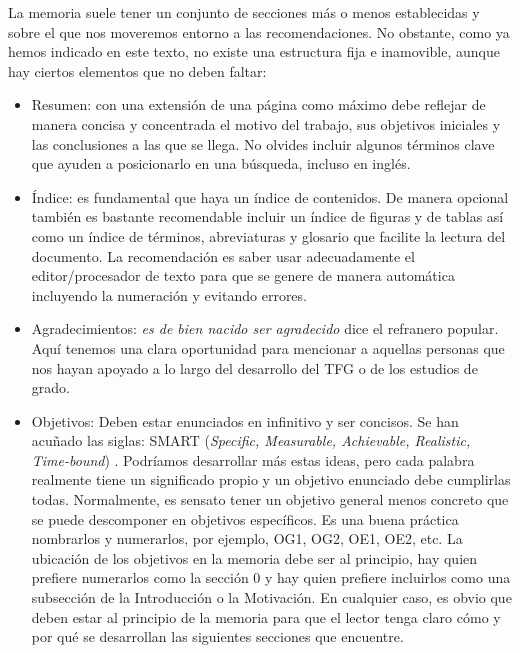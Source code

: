 La memoria suele tener un conjunto de secciones más o menos establecidas y sobre el que nos moveremos entorno a las recomendaciones. No obstante, como ya hemos indicado en este texto, no existe una estructura fija e inamovible, aunque hay ciertos elementos que no deben faltar:

\begin{itemize}
    \item Resumen: con una extensión de una página como máximo debe reflejar de manera concisa y concentrada el motivo del trabajo, sus objetivos iniciales y las conclusiones a las que se llega. No olvides incluir algunos términos clave que ayuden a posicionarlo en una búsqueda, incluso en inglés.
    \item Índice: es fundamental que haya un índice de contenidos. De manera opcional también es bastante recomendable incluir un índice de figuras y de tablas así como un índice de términos, abreviaturas y glosario que facilite la lectura del documento. La recomendación es saber usar adecuadamente el editor/procesador de texto para que se genere de manera automática incluyendo la numeración y evitando errores.
    
    \item Agradecimientos: {\it es de bien nacido ser agradecido} dice el refranero popular. Aquí tenemos una clara oportunidad para mencionar a aquellas personas que nos hayan apoyado a lo largo del desarrollo del TFG o de los estudios de grado. 
    \item Objetivos: Deben estar enunciados en infinitivo y ser concisos. Se han acuñado las siglas: SMART (\textit{Specific, Measurable, Achievable, Realistic, Time-bound}) \cite{doran1981there}.  Podríamos desarrollar más estas ideas, pero cada palabra realmente tiene un significado propio y un objetivo enunciado debe cumplirlas todas. Normalmente, es sensato tener un objetivo general menos concreto que se puede descomponer en objetivos específicos. Es una buena práctica nombrarlos y numerarlos, por ejemplo,  OG1, OG2, OE1, OE2, etc. La ubicación de los objetivos en la memoria debe ser al principio, hay quien prefiere numerarlos como la sección 0 y hay quien prefiere incluirlos como una subsección de la Introducción o la Motivación. En cualquier caso, es obvio que deben estar al principio de la memoria para que el lector tenga claro cómo y por qué se desarrollan las siguientes secciones que encuentre.


\end{itemize}
